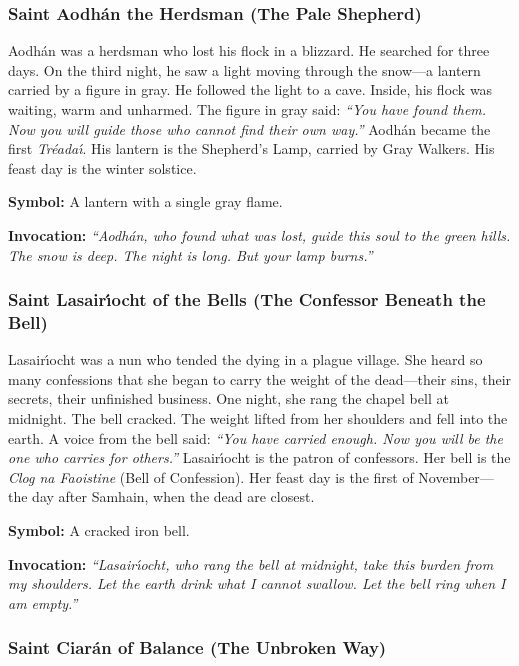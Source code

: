 \subsubsection*{Saint Aodh\'an the Herdsman (The Pale Shepherd)}

Aodh\'an was a herdsman who lost his flock in a blizzard. He searched for three days. On the third night, he saw a light moving through the snow---a lantern carried by a figure in gray. He followed the light to a cave. Inside, his flock was waiting, warm and unharmed. The figure in gray said: \textit{``You have found them. Now you will guide those who cannot find their own way.''} Aodh\'an became the first \textit{Tr\'eada\'{\i}}. His lantern is the Shepherd's Lamp, carried by Gray Walkers. His feast day is the winter solstice.

\textbf{Symbol:} A lantern with a single gray flame.

\textbf{Invocation:} \textit{``Aodh\'an, who found what was lost, guide this soul to the green hills. The snow is deep. The night is long. But your lamp burns.''}

\subsubsection*{Saint Lasair\'{\i}ocht of the Bells (The Confessor Beneath the Bell)}

Lasair\'{\i}ocht was a nun who tended the dying in a plague village. She heard so many confessions that she began to carry the weight of the dead---their sins, their secrets, their unfinished business. One night, she rang the chapel bell at midnight. The bell cracked. The weight lifted from her shoulders and fell into the earth. A voice from the bell said: \textit{``You have carried enough. Now you will be the one who carries for others.''} Lasair\'{\i}ocht is the patron of confessors. Her bell is the \textit{Clog na Faoistine} (Bell of Confession). Her feast day is the first of November---the day after Samhain, when the dead are closest.

\textbf{Symbol:} A cracked iron bell.

\textbf{Invocation:} \textit{``Lasair\'{\i}ocht, who rang the bell at midnight, take this burden from my shoulders. Let the earth drink what I cannot swallow. Let the bell ring when I am empty.''}

\subsubsection*{Saint Ciar\'an of Balance (The Unbroken Way)}


